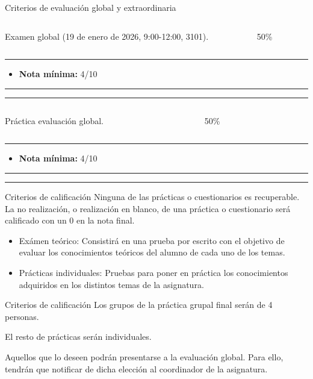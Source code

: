 \begin{frame}{Criterios de evaluación global y extraordinaria}
\begin{columns}[T]
\begin{column}{.49\textwidth}
Examen global  (19 de enero de 2026, 9:00-12:00, 3101).
\end{column}
\hfill
\begin{column}{.49\textwidth}
\centering
\alert{\Huge 50\%}
\end{column}
\end{columns}
\vfill
\hrule

\begin{itemize}
    \item \textbf{Nota mínima:} 4/10
\end{itemize}
\vfill
\hrule
\hrule

\vfill
\begin{columns}[T]
\begin{column}{.49\textwidth}
Práctica evaluación global.
\end{column}
\hfill
\begin{column}{.49\textwidth}
\centering
\alert{\Huge 50\%}
\end{column}
\end{columns}
\vfill
\hrule

\begin{itemize}
    \item \textbf{Nota mínima:} 4/10
\end{itemize}
\vfill
\hrule
\hrule
\vfill

\end{frame}

\begin{frame}{Criterios de calificación}
Ninguna de las prácticas o cuestionarios es recuperable. \alert{La no realización, o realización en blanco, de una práctica o cuestionario será calificado con un 0 en la nota final}.
\begin{itemize}
    \item \alert{Exámen teórico}: Consistirá en una prueba por escrito con el objetivo de evaluar los conocimientos teóricos del alumno de cada uno de los temas.
    \item \alert{Prácticas individuales}: Pruebas para poner en práctica los conocimientos adquiridos en los distintos temas de la asignatura.
\end{itemize}
\end{frame}

\begin{frame}{Criterios de calificación}
Los grupos de la \alert{práctica grupal} final serán de \alert{4 personas}.

El \alert{resto} de prácticas serán \alert{individuales}.

Aquellos que lo deseen podrán presentarse a la \alert{evaluación global}. Para ello, tendrán que notificar de dicha elección al coordinador de la asignatura.
\end{frame}

